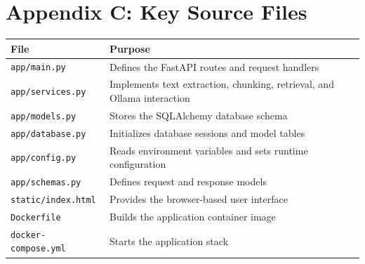 ﻿\documentclass[11pt,a4paper]{article}
\begin{document}
\section{Appendix C: Key Source Files}
\begin{longtable}{p{} p{}}
\textbf{File} & \textbf{Purpose} \\
\hline
\texttt{app/main.py} & Defines the FastAPI routes and request handlers \\
\texttt{app/services.py} & Implements text extraction, chunking, retrieval, and Ollama interaction \\
\texttt{app/models.py} & Stores the SQLAlchemy database schema \\
\texttt{app/database.py} & Initializes database sessions and model tables \\
\texttt{app/config.py} & Reads environment variables and sets runtime configuration \\
\texttt{app/schemas.py} & Defines request and response models \\
\texttt{static/index.html} & Provides the browser-based user interface \\
\texttt{Dockerfile} & Builds the application container image \\
\texttt{docker-compose.yml} & Starts the application stack \\
\end{longtable}
\end{document}
